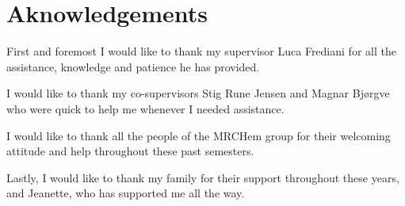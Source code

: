\documentclass[../Thesis.tex]{subfiles}
\begin{document}
\chapter{Aknowledgements}
First and foremost I would like to thank my supervisor Luca Frediani for all the
assistance, knowledge and patience he has provided.

I would like to thank my co-supervisors Stig Rune Jensen and Magnar Bjørgve
who were quick to help me whenever I needed assistance.

I would like to thank all the people of the MRCHem group for their welcoming attitude
and help throughout these past semesters.

Lastly, I would like to thank my family for their support throughout these years,
and Jeanette, who has supported me all the way.

\biblio
\end{document}
